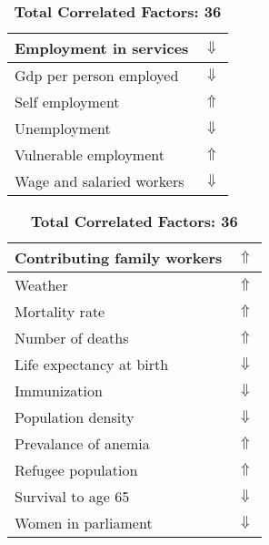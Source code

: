 \documentclass[12pt,notitlepage,oneside]{report}
\begin{document}
\begin{table}[!htb]
\begin{tabular}{|l|l|}
Employment in services & $\Downarrow$\\ \hline
Gdp per person employed & $\Downarrow$\\ \hline
Self employment & $\Uparrow$\\ \hline
Unemployment & $\Downarrow$\\ \hline
Vulnerable employment & $\Uparrow$\\ \hline
Wage and salaried workers & $\Downarrow$\\ \hline
\end{tabular}
\begin{tabular}{|l|l|}
\hline
Contributing family workers & $\Uparrow$\\ \hline
Weather & $\Uparrow$\\ \hline
Mortality rate & $\Uparrow$\\ \hline
Number of deaths & $\Uparrow$\\ \hline
Life expectancy at birth & $\Downarrow$\\ \hline
Immunization & $\Downarrow$\\ \hline
Population density & $\Downarrow$\\ \hline
Prevalance of anemia & $\Uparrow$\\ \hline
Refugee population & $\Uparrow$\\ \hline
Survival to age 65 & $\Downarrow$\\ \hline
Women in parliament & $\Downarrow$\\ \hline
\end{tabular}
\caption*{\textbf{Total Correlated Factors: 36}}
\end{table}
\clearpage
\end{document}
